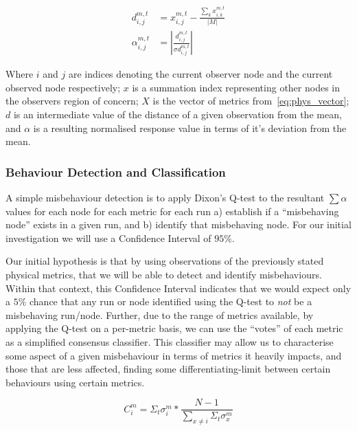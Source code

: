 \documentclass[conference,compsoc,letterpaper]{IEEEtran}
\begin{document}
\begin{align}
  d_{i,j}^{m,t} &= x_{i,j}^{m,t} - \frac{\sum_k x_{i,k}^{m,t}}{|M|}\label{eq:d}\\
  \alpha_{i,j}^{m,t} &= | \frac{d_{i,j}^{m,t}}{\sigma{d_{i,j}^{m,t}}}|\label{eq:dd}
\end{align}

Where $i$ and $j$ are indices denoting the current observer node and the current observed node respectively; $x$ is a summation index representing other nodes in the observers region of concern; $X$ is the vector of metrics from~\ref{eq:phys_vector}; $d$ is an intermediate value of the distance of a given observation from the mean, and $\alpha$ is a resulting normalised response value in terms of it's deviation from the mean.

\subsubsection{Behaviour Detection and Classification}
A simple misbehaviour detection is to apply Dixon's Q-test \cite{Dean1951} to the resultant $\sum\alpha$ values for each node for each metric for each run  a) establish if a ``misbehaving node'' exists in a given run, and b) identify that misbehaving node. 
For our initial investigation we will use a Confidence Interval of $95\%$.

Our initial hypothesis is that by using observations of the previously stated physical metrics, that we will be able to detect and identify misbehaviours.
Within that context, this Confidence Interval indicates that we would expect only a $5\%$ chance that any run or node identified using the Q-test to \emph{not} be a misbehaving run/node.
Further, due to the range of metrics available, by applying the Q-test on a per-metric basis, we can use the ``votes'' of each metric as a simplified consensus classifier.
This classifier may allow us to characterise some aspect of a given misbehaviour in terms of metrics it heavily impacts, and those that are less affected, finding some differentiating-limit between certain behaviours using certain metrics.

\begin{equation}
  C_{i}^{m} = \Sigma_t\sigma_{i}^m * \frac{N-1}{\sum_{x\neq i}{\Sigma_t\sigma_{x}^m}}\label{eq:confidence}
\end{equation}
\end{document}
